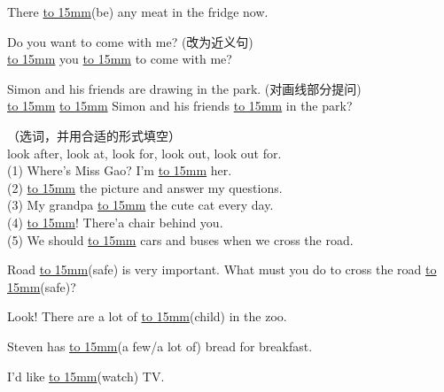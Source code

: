 \item{
    There \underline{\hbox to 15mm{}}(be) any meat in the fridge now.
    \\
}

\item{
    Do you want to come with me? (改为近义句) \\
    \underline{\hbox to 15mm{}} you \underline{\hbox to 15mm{}} to come with me?
    \\
}

\item{
    Simon and his friends are drawing in the park. (对画线部分提问) \\
    \underline{\hbox to 15mm{}} \underline{\hbox to 15mm{}} Simon and his friends \underline{\hbox to 15mm{}} in the park?
    \\
}

\item{
    （选词，并用合适的形式填空）\\
    look after, look at, look for, look out, look out for.\\
    (1) Where's Miss Gao? I'm \underline{\hbox to 15mm{}} her. \\
    (2) \underline{\hbox to 15mm{}} the picture and answer my questions.\\
    (3) My grandpa \underline{\hbox to 15mm{}} the cute cat every day.\\
    (4) \underline{\hbox to 15mm{}}! There'a chair behind you.\\
    (5) We should \underline{\hbox to 15mm{}} cars and buses when we cross the road.
    \\
}

\item{
    Road \underline{\hbox to 15mm{}}(safe) is very important. What must you do to cross the road \underline{\hbox to 15mm{}}(safe)?
    \\
}

\item{
    Look! There are a lot of \underline{\hbox to 15mm{}}(child) in the zoo. 
    \\
}

\item{
    Steven has \underline{\hbox to 15mm{}}(a few/a lot of) bread for breakfast.
    \\
}

\item{
    I'd like \underline{\hbox to 15mm{}}(watch) TV.
    \\
}

